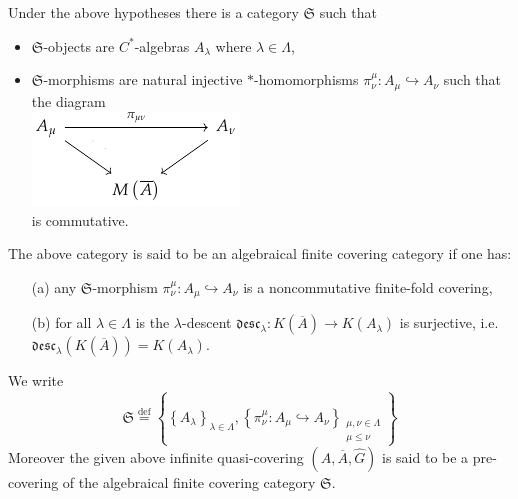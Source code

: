\documentclass{beamer}
\theoremstyle{plain}
\newcommand{\be}{\begin{equation}}
\newcommand{\ee}{\end{equation}}
\newcommand{\desc}{\mathfrak{desc}}
\newcommand{\la}{\lambda}
\newcommand{\La}{\Lambda}
\newcommand{\bydef}{\stackrel{\mathrm{def}}{=}}
\newcommand{\hookto}{\hookrightarrow}        %
\begin{document}
\begin{frame}
	Under the above hypotheses  there is a category $\mathfrak{S}$ such that
\begin{itemize}
	\item $\mathfrak{S}$-objects are $C^*$-algebras $A_\la$ where $\la\in \La$,
	\item $\mathfrak{S}$-morphisms are natural injective $*$-homomorphisms $\pi^\mu_\nu : A_\mu \hookto A_\nu$
	such that the diagram
	\\
\includegraphics[scale=0.8]{ag.png}
	\\
	is commutative.
\end{itemize}

\end{frame}
\begin{frame}
 
\begin{definition}\label{algebraical_finite_covering_category_defn}
	The  above category is said to be an \alert{algebraical finite covering category} if one has:
	\begin{enumerate}
		\item [(a)] 
		any $\mathfrak{S}$-morphism $\pi^\mu_\nu : A_\mu \hookto A_\nu$ is a noncommutative finite-fold  covering,
		\item[(b)] for all $\la \in \La$ is the $\la$-{descent} $\desc_{\la} : K\left(\overline A \right) \to K\left(A_\la \right)$   is surjective, i.e. $\desc_{\la} \left(  K\left(\overline A \right)\right) = K\left(A_\la \right)$.%
	\end{enumerate}
	We write
	\be\label{algebraical_finite_covering_category_eqn}
	\mathfrak{S}\bydef \left\{\left\{A_\la\right\}_{\la\in \La}, \left\{\pi^\mu_\nu : A_\mu \hookto A_\nu\right\}_{\substack{\mu, \nu \in \La\\\mu \le \nu}}\right\}
	\ee
	Moreover the given above infinite quasi-covering $\left( A, \overline A, \widehat G\right)$ is said to be a \alert{pre-covering of the algebraical finite covering category}  $\mathfrak{S}$.
\end{definition}


\end{frame}
\end{document}
